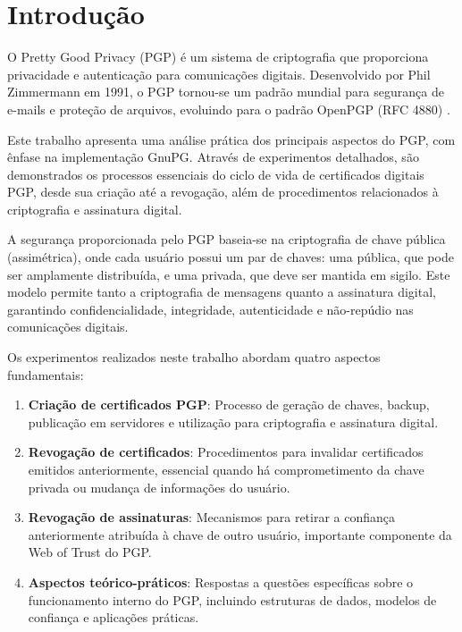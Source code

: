 \chapter{Introdução}

O Pretty Good Privacy (PGP) é um sistema de criptografia que proporciona privacidade e autenticação para comunicações digitais. Desenvolvido por Phil Zimmermann em 1991, o PGP tornou-se um padrão mundial para segurança de e-mails e proteção de arquivos, evoluindo para o padrão OpenPGP (RFC 4880) \cite{rfc4880}.

Este trabalho apresenta uma análise prática dos principais aspectos do PGP, com ênfase na implementação GnuPG. Através de experimentos detalhados, são demonstrados os processos essenciais do ciclo de vida de certificados digitais PGP, desde sua criação até a revogação, além de procedimentos relacionados à criptografia e assinatura digital.

A segurança proporcionada pelo PGP baseia-se na criptografia de chave pública (assimétrica), onde cada usuário possui um par de chaves: uma pública, que pode ser amplamente distribuída, e uma privada, que deve ser mantida em sigilo. Este modelo permite tanto a criptografia de mensagens quanto a assinatura digital, garantindo confidencialidade, integridade, autenticidade e não-repúdio nas comunicações digitais.

Os experimentos realizados neste trabalho abordam quatro aspectos fundamentais:

\begin{enumerate}
    \item \textbf{Criação de certificados PGP}: Processo de geração de chaves, backup, publicação em servidores e utilização para criptografia e assinatura digital.
    
    \item \textbf{Revogação de certificados}: Procedimentos para invalidar certificados emitidos anteriormente, essencial quando há comprometimento da chave privada ou mudança de informações do usuário.
    
    \item \textbf{Revogação de assinaturas}: Mecanismos para retirar a confiança anteriormente atribuída à chave de outro usuário, importante componente da Web of Trust do PGP.
    
    \item \textbf{Aspectos teórico-práticos}: Respostas a questões específicas sobre o funcionamento interno do PGP, incluindo estruturas de dados, modelos de confiança e aplicações práticas.
\end{enumerate}

